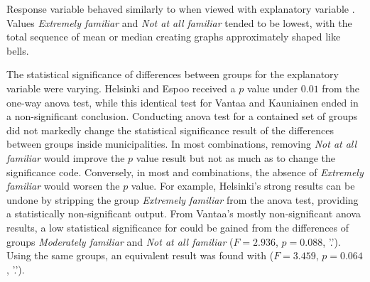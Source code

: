 Response variable  behaved similarly to  when viewed with explanatory variable . Values \textit{Extremely familiar} and \textit{Not at all familiar} tended to be lowest, with the total sequence of mean or median creating graphs approximately shaped like bells.

The statistical significance of differences between groups for the explanatory variable  were varying. Helsinki and Espoo received a $p$ value under $0.01$ from the one-way \acrshort{anova} test, while this identical test for Vantaa and Kauniainen ended in a non-significant conclusion. Conducting \acrshort{anova} test for a contained set of  groups did not markedly change the statistical significance result of the differences between groups inside municipalities. In most combinations, removing \textit{Not at all familiar} would improve the $p$ value result but not as much as to change the significance code. Conversely, in most  and  combinations, the absence of \textit{Extremely familiar} would worsen the $p$ value. For example, Helsinki's strong  results can be undone by stripping the group \textit{Extremely familiar} from the \acrshort{anova} test, providing a statistically non-significant output. From Vantaa's mostly non-significant \acrshort{anova} results, a low statistical significance for  could be gained from the differences of groups \textit{Moderately familiar} and \textit{Not at all familiar} ($F = 2.936$, $p = 0.088$, '.'). Using the same groups, an equivalent result was found with  ($F = 3.459$, $p = 0.064$, '.').

